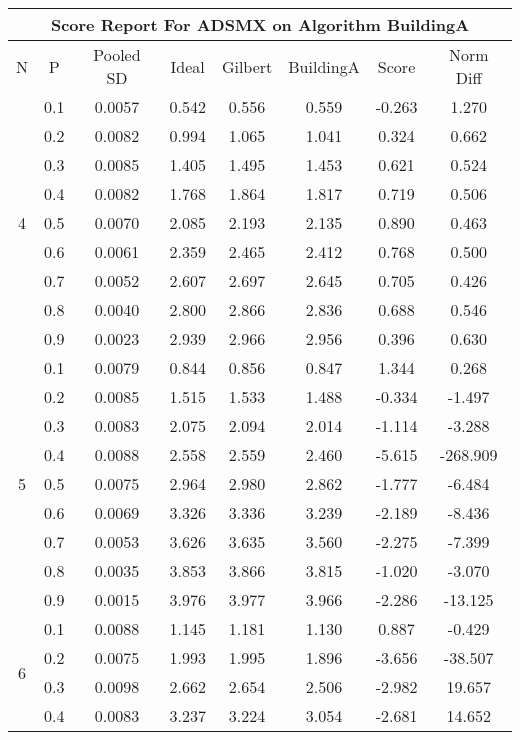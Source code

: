 \documentclass[11pt,a4paper]{report}
\begin{document}
\begin{longtable}{ | c | c || c | c | c | c | c | c | }
\hline
\multicolumn{8}{|c|}{ Score Report For ADSMX on Algorithm BuildingA} \\
\hline
N & P & Pooled SD &  Ideal &  Gilbert & BuildingA  & Score & Norm Diff \\
 \hline
 \hline
 \endhead
\multirow{9}{*}{4} & 0.1 & 0.0057 & 0.542 & 0.556 & 0.559 & -0.263 & 1.270 \\
 & 0.2 & 0.0082 & 0.994 & 1.065 & 1.041 & 0.324 & 0.662 \\
 & 0.3 & 0.0085 & 1.405 & 1.495 & 1.453 & 0.621 & 0.524 \\
 & 0.4 & 0.0082 & 1.768 & 1.864 & 1.817 & 0.719 & 0.506 \\
 & 0.5 & 0.0070 & 2.085 & 2.193 & 2.135 & 0.890 & 0.463 \\
 & 0.6 & 0.0061 & 2.359 & 2.465 & 2.412 & 0.768 & 0.500 \\
 & 0.7 & 0.0052 & 2.607 & 2.697 & 2.645 & 0.705 & 0.426 \\
 & 0.8 & 0.0040 & 2.800 & 2.866 & 2.836 & 0.688 & 0.546 \\
 & 0.9 & 0.0023 & 2.939 & 2.966 & 2.956 & 0.396 & 0.630 \\
 \hline
\multirow{9}{*}{5} & 0.1 & 0.0079 & 0.844 & 0.856 & 0.847 & 1.344 & 0.268 \\
 & 0.2 & 0.0085 & 1.515 & 1.533 & 1.488 & -0.334 & -1.497 \\
 & 0.3 & 0.0083 & 2.075 & 2.094 & 2.014 & -1.114 & -3.288 \\
 & 0.4 & 0.0088 & 2.558 & 2.559 & 2.460 & -5.615 & -268.909 \\
 & 0.5 & 0.0075 & 2.964 & 2.980 & 2.862 & -1.777 & -6.484 \\
 & 0.6 & 0.0069 & 3.326 & 3.336 & 3.239 & -2.189 & -8.436 \\
 & 0.7 & 0.0053 & 3.626 & 3.635 & 3.560 & -2.275 & -7.399 \\
 & 0.8 & 0.0035 & 3.853 & 3.866 & 3.815 & -1.020 & -3.070 \\
 & 0.9 & 0.0015 & 3.976 & 3.977 & 3.966 & -2.286 & -13.125 \\
 \hline
\multirow{9}{*}{6} & 0.1 & 0.0088 & 1.145 & 1.181 & 1.130 & 0.887 & -0.429 \\
 & 0.2 & 0.0075 & 1.993 & 1.995 & 1.896 & -3.656 & -38.507 \\
 & 0.3 & 0.0098 & 2.662 & 2.654 & 2.506 & -2.982 & 19.657 \\
 & 0.4 & 0.0083 & 3.237 & 3.224 & 3.054 & -2.681 & 14.652 \\

\end{longtable}
\end{document}
